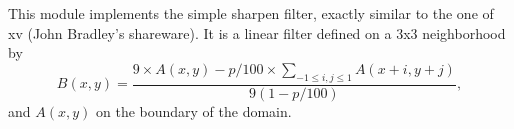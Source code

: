 This module implements the simple sharpen filter, exactly similar to
the one of xv (John Bradley's shareware). It is a linear filter
defined on a 3x3 neighborhood by
$$ B(x,y) = 
\frac{\displaystyle 9 \times A(x,y) - p/100 \times \sum_{-1\leq i,j\leq 1}A(x+i,y+j)}{9(1-p/100)},$$
and $A(x,y)$ on the boundary of the domain.


